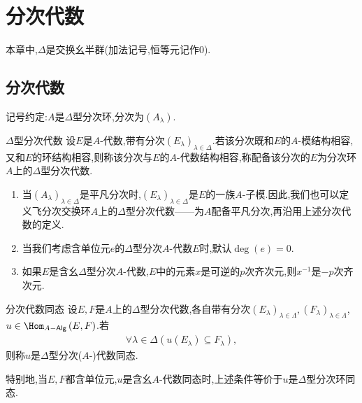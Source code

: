 \chapter{分次代数}

本章中,$\Delta$是交换幺半群(加法记号,恒等元记作$0$).

\section{分次代数}

记号约定:$A$是$\Delta$型分次环,分次为$\left(A_{\lambda}\right)$.

\begin{definition}{$\Delta$型分次代数}{}
	设$E$是$A$-代数,带有分次$\left(E_{\lambda}\right)_{\lambda\in\Delta}$.若该分次既和$E$的$A$-模结构相容,又和$E$的环结构相容,则称该分次与$E$的$A$-代数结构相容,称配备该分次的$E$为分次环$A$上的$\Delta$型分次代数.
\end{definition}

\begin{remark}{}{}
	\begin{enumerate}
		\item 当$\left(A_{\lambda}\right)_{\lambda\in\Delta}$是平凡分次时,$\left(E_{\lambda}\right)_{\lambda\in\Delta}$是$E$的一族$A$-子模.因此,我们也可以定义飞分次交换环$A$上的$\Delta$型分次代数——为$A$配备平凡分次,再沿用上述分次代数的定义.
		\item 当我们考虑含单位元$e$的$\Delta$型分次$A$-代数$E$时,默认$\deg\left(e\right)=0$.
		\item 如果$E$是含幺$\Delta$型分次$A$-代数,$E$中的元素$x$是可逆的$p$次齐次元,则$x^{-1}$是$-p$次齐次元. 
	\end{enumerate}
\end{remark}

\begin{definition}{分次代数同态}{}
	设$E,F$是$A$上的$\Delta$型分次代数,各自带有分次$\left(E_{\lambda}\right)_{\lambda\in\Lambda},\left(F_{\lambda}\right)_{\lambda\in\Lambda}$,$u\in\Hom_{A-\mathsf{Alg}}\left(E,F\right)$.若
	\begin{align*}
		\forall\lambda\in\Delta\left(u\left(E_{\lambda}\right)\subseteq F_{\lambda}\right),
	\end{align*}
	则称$u$是$\Delta$型分次($A$-)代数同态.
\end{definition}

\begin{remark}{}{}
	特别地,当$E,F$都含单位元,$u$是含幺$A$-代数同态时,上述条件等价于$u$是$\Delta$型分次环同态.
\end{remark}

